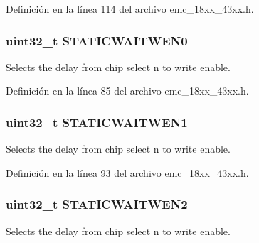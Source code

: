 Definición en la línea 114 del archivo emc\+\_\+18xx\+\_\+43xx.\+h.

\subsubsection[{\texorpdfstring{S\+T\+A\+T\+I\+C\+W\+A\+I\+T\+W\+E\+N0}{STATICWAITWEN0}}]{ uint32\+\_\+t S\+T\+A\+T\+I\+C\+W\+A\+I\+T\+W\+E\+N0}\hypertarget{struct_l_p_c___e_m_c___t_ae0cea3a2de29fc286002923176979da1}{}\label{struct_l_p_c___e_m_c___t_ae0cea3a2de29fc286002923176979da1}
Selects the delay from chip select n to write enable. 

Definición en la línea 85 del archivo emc\+\_\+18xx\+\_\+43xx.\+h.

\subsubsection[{\texorpdfstring{S\+T\+A\+T\+I\+C\+W\+A\+I\+T\+W\+E\+N1}{STATICWAITWEN1}}]{ uint32\+\_\+t S\+T\+A\+T\+I\+C\+W\+A\+I\+T\+W\+E\+N1}\hypertarget{struct_l_p_c___e_m_c___t_a5a84a20707b71d275c860811a88b0e4c}{}\label{struct_l_p_c___e_m_c___t_a5a84a20707b71d275c860811a88b0e4c}
Selects the delay from chip select n to write enable. 

Definición en la línea 93 del archivo emc\+\_\+18xx\+\_\+43xx.\+h.

\subsubsection[{\texorpdfstring{S\+T\+A\+T\+I\+C\+W\+A\+I\+T\+W\+E\+N2}{STATICWAITWEN2}}]{ uint32\+\_\+t S\+T\+A\+T\+I\+C\+W\+A\+I\+T\+W\+E\+N2}\hypertarget{struct_l_p_c___e_m_c___t_ad8a0af9aeae144115f018116850ecd82}{}\label{struct_l_p_c___e_m_c___t_ad8a0af9aeae144115f018116850ecd82}
Selects the delay from chip select n to write enable. 

